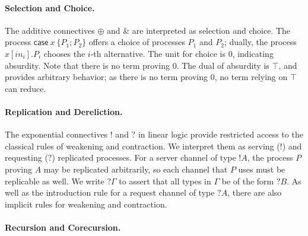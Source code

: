 \documentclass[orivec,envcountsame]{llncs}
\newcommand{\with}{\mathbin\binampersand}
\newcommand{\cpbang}[1]{{! #1}}
\newcommand{\cpquery}[1]{{? #1}}
\newcommand{\mkwd}[1]{\mathsf{#1}}
\newcommand{\clabel}[1]{\mathit{#1}}
\renewcommand{\case}[2]{\mkwd{case}\:#1\:\{#2\}}
\newcommand{\sel}[2]{#1[\clabel{#2}]}
\begin{document}
\paragraph{Selection and Choice.}

The additive connectives $\oplus$ and $\with$ are interpreted as selection and choice. The process
$\case{x}{P_1;P_2}$ offers a choice of processes $P_1$ and $P_2$; dually, the process
$\sel{x}{in_i}.P_i$ chooses the $i$-th alternative. The unit for choice is $0$, indicating
absurdity. Note that there is no term proving $0$. The dual of absurdity is $\top$, and provides
arbitrary behavior; as there is no term proving $0$, no term relying on $\top$ can reduce.

\paragraph{Replication and Dereliction.}

The exponential connectives $!$ and $?$ in linear logic provide restricted access to the classical
rules of weakening and contraction. We interpret them as serving ($!$) and requesting ($?$)
replicated processes.
For a server channel of type $\cpbang{A}$, the process $P$ proving $A$ may be replicated
arbitrarily, so each channel that $P$ uses must be replicable as well. We write $\cpquery{\Gamma}$
to assert that all types in $\Gamma$ be of the form $\cpquery{B}$. As well as the introduction rule
for a request channel of type $\cpquery{A}$, there are also implicit rules for weakening and
contraction.

\paragraph{Recursion and Corecursion.}
\end{document}
